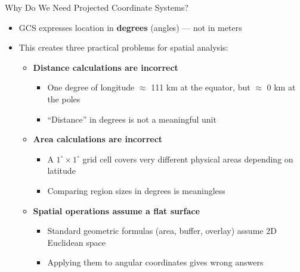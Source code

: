 \documentclass[hyperref={pdfpagelabels=false}]{beamer}
\begin{document}
\begin{frame}{Why Do We Need Projected Coordinate Systems?}
    \begin{itemize}
        \item GCS expresses location in \textbf{degrees} (angles) --- not in meters
        \vspace{0.2cm}
        \item This creates three practical problems for spatial analysis:
        \vspace{0.3cm}
        \begin{itemize}
            \item \textbf{Distance calculations are incorrect}
            \vspace{0.1cm}
            \begin{itemize}
                \item One degree of longitude $\approx$ 111 km at the equator, but $\approx$ 0 km at the poles
                            \vspace{0.1cm}
                \item ``Distance'' in degrees is not a meaningful unit
            \end{itemize}
            \vspace{0.2cm}
            \item \textbf{Area calculations are incorrect}
            \vspace{0.1cm}
            \begin{itemize}
                \item A $1^\circ \times 1^\circ$ grid cell covers very different physical areas depending on latitude
                            \vspace{0.1cm}
                \item Comparing region sizes in degrees is meaningless
            \end{itemize}
            \vspace{0.2cm}
            \item \textbf{Spatial operations assume a flat surface}
            \vspace{0.1cm}
            \begin{itemize}
                \item Standard geometric formulas (area, buffer, overlay) assume 2D Euclidean space
                            \vspace{0.1cm}
                \item Applying them to angular coordinates gives wrong answers
            \end{itemize}
        \end{itemize}
    \end{itemize}


\end{frame} 
 
\end{document}
